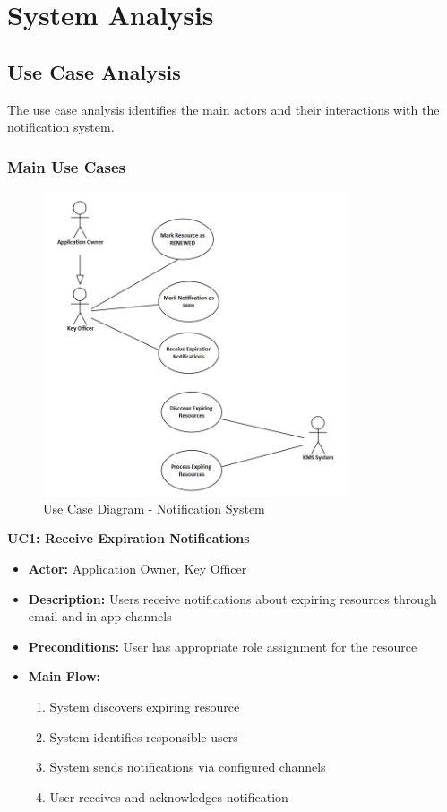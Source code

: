 \newpage
\section{System Analysis}

\subsection{Use Case Analysis}

The use case analysis identifies the main actors and their interactions with the notification system.

\subsubsection{Main Use Cases}

\begin{figure}[H]
    \centering
    \includegraphics[width=0.8\textwidth]{images/use_case_diagram.jpg}
    \caption{Use Case Diagram - Notification System}
    \label{fig:use_case_diagram}
\end{figure}

\textbf{UC1: Receive Expiration Notifications}
\begin{itemize}
    \item \textbf{Actor:} Application Owner, Key Officer
    \item \textbf{Description:} Users receive notifications about expiring resources through email and in-app channels
    \item \textbf{Preconditions:} User has appropriate role assignment for the resource
    \item \textbf{Main Flow:} 
        \begin{enumerate}
            \item System discovers expiring resource
            \item System identifies responsible users
            \item System sends notifications via configured channels
            \item User receives and acknowledges notification
        \end{enumerate}
\end{itemize}

